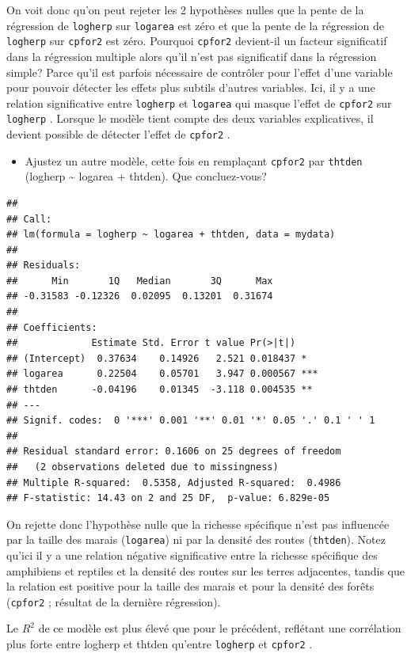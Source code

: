 \documentclass[12pt,]{book}
\providecommand{\tightlist}{%
  \setlength{\itemsep}{0pt}\setlength{\parskip}{0pt}}
\begin{document}
On voit donc qu'on peut rejeter les 2 hypothèses nulles que la pente de la régression de \texttt{logherp} sur \texttt{logarea} est zéro et que la pente de la régression de \texttt{logherp} sur \texttt{cpfor2} est zéro. Pourquoi \texttt{cpfor2} devient-il un facteur significatif dans la régression multiple alors qu'il n'est pas significatif dans la régression simple? Parce qu'il est parfois nécessaire de contrôler pour l'effet d'une variable pour pouvoir détecter les effets plus subtils d'autres variables. Ici, il y a une relation significative entre \texttt{logherp} et \texttt{logarea} qui masque l'effet de \texttt{cpfor2} sur \texttt{logherp} . Lorsque le modèle tient compte des deux variables explicatives, il devient possible de détecter l'effet de \texttt{cpfor2} .

\begin{itemize}
\tightlist
\item
  Ajustez un autre modèle, cette fois en remplaçant \texttt{cpfor2} par \texttt{thtden} (logherp \textasciitilde{} logarea + thtden). Que concluez-vous?
\end{itemize}

\begin{verbatim}
## 
## Call:
## lm(formula = logherp ~ logarea + thtden, data = mydata)
## 
## Residuals:
##      Min       1Q   Median       3Q      Max 
## -0.31583 -0.12326  0.02095  0.13201  0.31674 
## 
## Coefficients:
##             Estimate Std. Error t value Pr(>|t|)    
## (Intercept)  0.37634    0.14926   2.521 0.018437 *  
## logarea      0.22504    0.05701   3.947 0.000567 ***
## thtden      -0.04196    0.01345  -3.118 0.004535 ** 
## ---
## Signif. codes:  0 '***' 0.001 '**' 0.01 '*' 0.05 '.' 0.1 ' ' 1
## 
## Residual standard error: 0.1606 on 25 degrees of freedom
##   (2 observations deleted due to missingness)
## Multiple R-squared:  0.5358, Adjusted R-squared:  0.4986 
## F-statistic: 14.43 on 2 and 25 DF,  p-value: 6.829e-05
\end{verbatim}

On rejette donc l'hypothèse nulle que la richesse spécifique n'est pas influencée par la taille des marais (\texttt{logarea}) ni par la densité des routes (\texttt{thtden}). Notez qu'ici il y a une relation négative significative entre la richesse spécifique des amphibiens et reptiles et la densité des routes sur les terres adjacentes, tandis que la relation est positive pour la taille des marais et pour la densité des forêts (\texttt{cpfor2} ; résultat de la dernière régression).

Le \(R^2\) de ce modèle est plus élevé que pour le précédent, reflétant une corrélation plus forte entre logherp et thtden qu'entre \texttt{logherp} et \texttt{cpfor2} .
\end{document}
